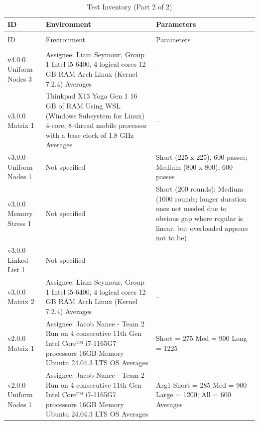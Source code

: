 \footnotesize
\setlength{\tabcolsep}{4pt}
\renewcommand{\arraystretch}{1.15}
\begin{longtable}{>{\raggedright\arraybackslash}p{}>{\raggedright\arraybackslash}p{}>{\raggedright\arraybackslash}p{}}
\caption{Test Inventory (Part 2 of 2)}\label{TestInventory2}\\
\toprule
ID & Environment & Parameters \\ \midrule
\endfirsthead
\multicolumn{3}{c}{\tablename\ \thetable{} -- continued from previous page} \\
\toprule
ID & Environment & Parameters \\ \midrule
\endhead
\midrule
\multicolumn{3}{r}{Continued on next page} \\
\endfoot
\bottomrule
\endlastfoot
v4.0.0 \textbar{} Uniform Nodes \textbar{} 3 & Assignee: \textbar{}  Liam Seymour, Group 1 \textbar{}  Intel i5-6400, 4 logical cores \textbar{}  12 GB RAM \textbar{}  Arch Linux (Kernel 7.2.4) \textbar{}  Averages & -- \\
v3.0.0 \textbar{} Matrix \textbar{} 1 & Thinkpad X13 Yoga Gen 1 \textbar{}  16 GB of RAM \textbar{}  Using WSL (Windows Subsystem for Linux) \textbar{}  4-core, 8-thread mobile processor with a base clock of 1.8 GHz \textbar{}  Averages & -- \\
v3.0.0 \textbar{} Uniform Nodes \textbar{} 1 & Not specified & Short (225 x 225), 600 passes; Medium (800 x 800), 600 passes \\
v3.0.0 \textbar{} Memory Stress \textbar{} 1 & Not specified & Short (200 rounds); Medium (1000 rounds; longer duration ones not needed due to obvious gap where regular is linear, but overloaded appears not to be) \\
v3.0.0 \textbar{} Linked List \textbar{} 1 & Not specified & -- \\
v3.0.0 \textbar{} Matrix \textbar{} 2 & Assignee: \textbar{}  Liam Seymour, Group 1 \textbar{}  Intel i5-6400, 4 logical cores \textbar{}  12 GB RAM \textbar{}  Arch Linux (Kernel 7.2.4) \textbar{}  Averages & -- \\
v2.0.0 \textbar{} Matrix \textbar{} 1 & Assignee: \textbar{}  Jacob Nance - Team 2 \textbar{}  Run on 4 consecutive 11th Gen Intel Core™ i7-1165G7  processors \textbar{}  16GB Memory \textbar{}  Ubuntu 24.04.3 LTS  OS \textbar{}  Averages & Short = 275 \textbar{}  Med = 900 \textbar{}  Long = 1225 \\
v2.0.0 \textbar{} Uniform Nodes \textbar{} 1 & Assignee: \textbar{}  Jacob Nance - Team 2 \textbar{}  Run on 4 consecutive 11th Gen Intel Core™ i7-1165G7  processors \textbar{}  16GB Memory \textbar{}  Ubuntu 24.04.3 LTS  OS \textbar{}  Averages & Arg1 \textbar{}  Short = 285 \textbar{}  Med = 900 \textbar{}  Large = 1200; All = 600 \textbar{}  Averages \\

\end{longtable}
